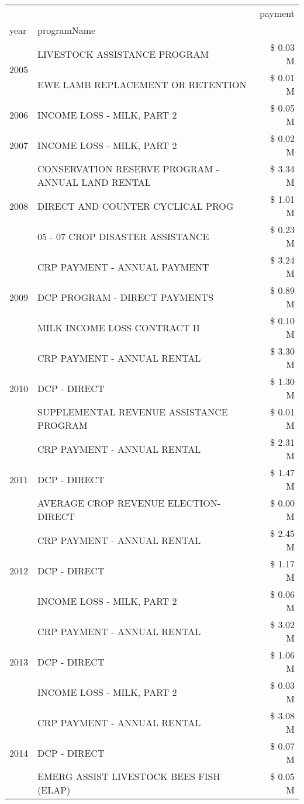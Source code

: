 \begin{tabular}{llr}
\toprule
 &  & payment \\
year & programName &  \\
\midrule
\multirow[t]{2}{*}{2005} & LIVESTOCK ASSISTANCE PROGRAM & \$ 0.03 M \\
 & EWE LAMB REPLACEMENT OR RETENTION & \$ 0.01 M \\
\cline{1-3}
2006 & INCOME LOSS - MILK, PART 2 & \$ 0.05 M \\
\cline{1-3}
2007 & INCOME LOSS - MILK, PART 2 & \$ 0.02 M \\
\cline{1-3}
\multirow[t]{3}{*}{2008} & CONSERVATION RESERVE PROGRAM - ANNUAL LAND RENTAL & \$ 3.34 M \\
 & DIRECT AND COUNTER CYCLICAL PROG & \$ 1.01 M \\
 & 05 - 07 CROP DISASTER ASSISTANCE & \$ 0.23 M \\
\cline{1-3}
\multirow[t]{3}{*}{2009} & CRP PAYMENT - ANNUAL PAYMENT & \$ 3.24 M \\
 & DCP PROGRAM - DIRECT PAYMENTS & \$ 0.89 M \\
 & MILK INCOME LOSS CONTRACT II & \$ 0.10 M \\
\cline{1-3}
\multirow[t]{3}{*}{2010} & CRP PAYMENT - ANNUAL RENTAL & \$ 3.30 M \\
 & DCP - DIRECT & \$ 1.30 M \\
 & SUPPLEMENTAL REVENUE ASSISTANCE PROGRAM & \$ 0.01 M \\
\cline{1-3}
\multirow[t]{3}{*}{2011} & CRP PAYMENT - ANNUAL RENTAL & \$ 2.31 M \\
 & DCP - DIRECT & \$ 1.47 M \\
 & AVERAGE CROP REVENUE ELECTION-DIRECT & \$ 0.00 M \\
\cline{1-3}
\multirow[t]{3}{*}{2012} & CRP PAYMENT - ANNUAL RENTAL & \$ 2.45 M \\
 & DCP - DIRECT & \$ 1.17 M \\
 & INCOME LOSS - MILK, PART 2 & \$ 0.06 M \\
\cline{1-3}
\multirow[t]{3}{*}{2013} & CRP PAYMENT - ANNUAL RENTAL & \$ 3.02 M \\
 & DCP - DIRECT & \$ 1.06 M \\
 & INCOME LOSS - MILK, PART 2 & \$ 0.03 M \\
\cline{1-3}
\multirow[t]{3}{*}{2014} & CRP PAYMENT - ANNUAL RENTAL & \$ 3.08 M \\
 & DCP - DIRECT & \$ 0.07 M \\
 & EMERG ASSIST LIVESTOCK BEES FISH (ELAP) & \$ 0.05 M \\

\end{tabular}
